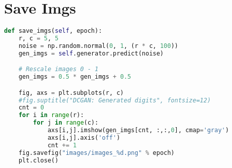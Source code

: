 \section{Save Imgs} %
\label{sec:save_imgs}
\begin{lstlisting}[basicstyle=\scriptsize,language=Python]
def save_imgs(self, epoch):
    r, c = 5, 5
    noise = np.random.normal(0, 1, (r * c, 100))
    gen_imgs = self.generator.predict(noise)

    # Rescale images 0 - 1
    gen_imgs = 0.5 * gen_imgs + 0.5

    fig, axs = plt.subplots(r, c)
    #fig.suptitle("DCGAN: Generated digits", fontsize=12)
    cnt = 0
    for i in range(r):
        for j in range(c):
            axs[i,j].imshow(gen_imgs[cnt, :,:,0], cmap='gray')
            axs[i,j].axis('off')
            cnt += 1
    fig.savefig("images/images_%d.png" % epoch)
    plt.close()
\end{lstlisting}
